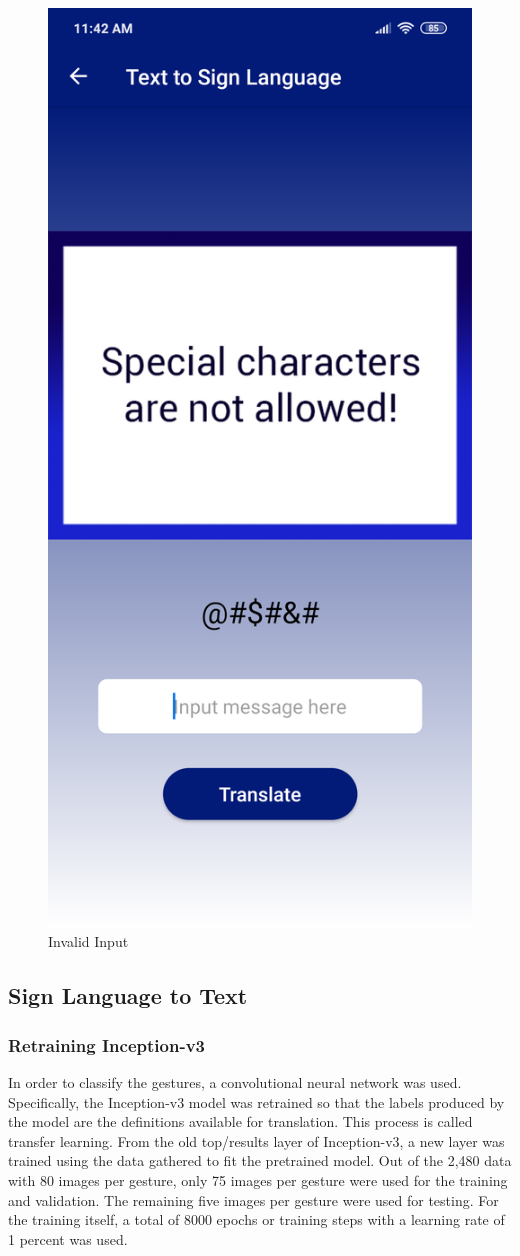 \documentclass[journal]{./IEEE/IEEEtran}
\begin{document}
\begin{figure}[ht!]
    \centering
    \includegraphics[width=0.58\linewidth]{./images/screen_tts_error.png}
    \caption{Invalid Input}
    \label{fig:tts_error}
\end{figure}

\subsection{Sign Language to Text}
\subsubsection{Retraining Inception-v3}
In order to classify the gestures, a convolutional neural network was used. Specifically, the Inception-v3 model was retrained so that the labels produced by the model are the definitions available for translation.
\newline
\indent This process is called transfer learning. From the old top/results layer of Inception-v3, a new layer was trained using the data gathered to fit the pretrained model. Out of the 2,480 data with 80 images per gesture, only 75 images per gesture were used for the training and validation. The remaining five images per gesture were used for testing.
\newline
\indent For the training itself, a total of 8000 epochs or training steps with a learning rate of 1 percent was used.
\newline
\end{document}
